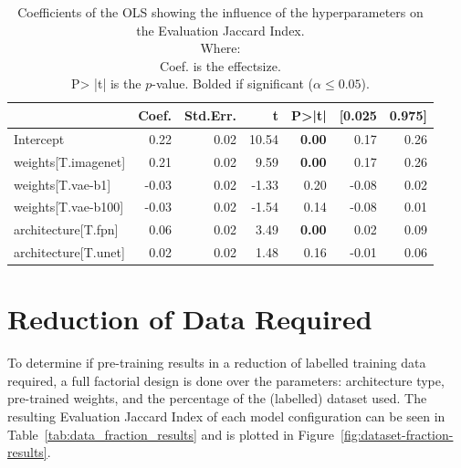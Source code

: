 \begin{table}[h]
    \centering
    \caption{Coefficients of the OLS showing the influence of the hyperparameters on the Evaluation Jaccard Index.\\Where:\\\hphantom{tabb}Coef. is the effectsize.\\\hphantom{tabb}P> |t| is the $p$-value. Bolded if significant ($\alpha\le0.05$).}
    \label{tab:comparison_baselines_ols_effects}
    \begin{tabular}{lrrrrrr}
        \toprule
                             & Coef. & Std.Err. & t     & P>|t|         & [0.025 & 0.975] \\
        \midrule
        Intercept            & 0.22  & 0.02     & 10.54 & \textbf{0.00} & 0.17   & 0.26   \\
        weights[T.imagenet]  & 0.21  & 0.02     & 9.59  & \textbf{0.00} & 0.17   & 0.26   \\
        weights[T.vae-b1]    & -0.03 & 0.02     & -1.33 & 0.20          & -0.08  & 0.02   \\
        weights[T.vae-b100]  & -0.03 & 0.02     & -1.54 & 0.14          & -0.08  & 0.01   \\
        architecture[T.fpn]  & 0.06  & 0.02     & 3.49  & \textbf{0.00} & 0.02   & 0.09   \\
        architecture[T.unet] & 0.02  & 0.02     & 1.48  & 0.16          & -0.01  & 0.06   \\
        \bottomrule
    \end{tabular}
\end{table}

\section{Reduction of Data Required}
To determine if pre-training results in a reduction of labelled training data required, a full factorial design is done over the parameters: architecture type, pre-trained weights, and the percentage of the (labelled) dataset used. The resulting Evaluation Jaccard Index of each model configuration can be seen in Table~\ref{tab:data_fraction_results} and is plotted in Figure~\ref{fig:dataset-fraction-results}.


